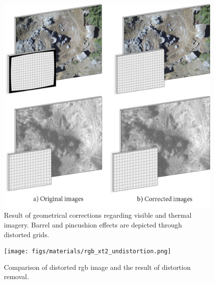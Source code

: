 \begin{figure}
    \includegraphics{figs/materials/thermal_distortion.png}
    \caption{Result of geometrical corrections regarding visible and thermal imagery. Barrel and pincushion effects are depicted through distorted grids.}
    \label{fig:thermal_rgb_distortion}
\end{figure}

\begin{figure}[ht]
	\centering
	\texttt{[image: figs/materials/rgb\_xt2\_undistortion.png]}
	\caption{Comparison of distorted \acrshort{rgb} image and the result of distortion removal.}
	\label{fig:rgb_xt2_undistortion}
\end{figure}


